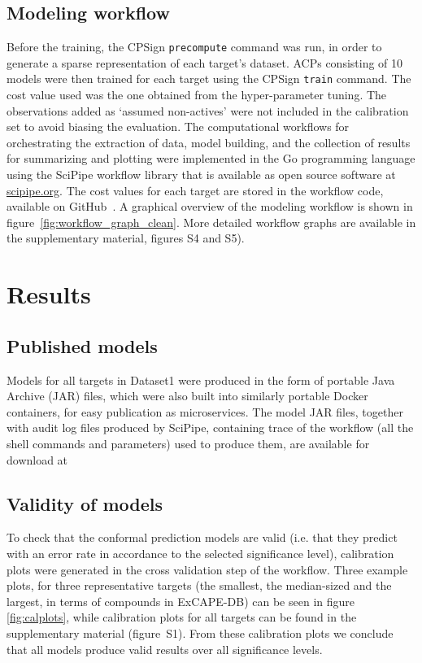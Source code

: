 \documentclass[utf8]{frontiersSCNS} %
\begin{document}
\subsection{Modeling workflow}
Before the training, the CPSign \texttt{precompute} command was run, in order
to generate a sparse representation of each target's dataset.  ACPs consisting
of 10 models were then trained for each target using the CPSign \texttt{train}
command. The cost value used was the one obtained from the hyper-parameter
tuning. The observations added as `assumed non-actives' were not included in
the calibration set to avoid biasing the evaluation.
The computational workflows for orchestrating the extraction of data, model
building, and the collection of results for summarizing and plotting were
implemented in the Go programming language using the SciPipe workflow library
that is available as open source software at
\href{http://scipipe.org}{scipipe.org}.  The cost values for each target are
stored in the workflow code, available on GitHub~\cite{PTPGitHub}.
A graphical overview of the modeling workflow is shown in
figure~\ref{fig:workflow_graph_clean}. More detailed workflow graphs are
available in the supplementary material, figures S4 and S5).


\section{Results} \label{Results}

\subsection{Published models}
Models for all targets in Dataset1 were produced in the form of portable Java
Archive (JAR) files, which were also built into similarly portable Docker
containers, for easy publication as microservices.  The model JAR files,
together with audit log files produced by SciPipe, containing trace of the
workflow (all the shell commands and parameters) used to produce them, are
available for download at~\cite{ModelsZenodo}

\subsection{Validity of models}

To check that the conformal prediction models are valid (i.e. that they predict with
an error rate in accordance to the selected significance level), calibration plots
were generated in the cross validation step of the workflow. Three example
plots, for three representative targets (the smallest, the median-sized and the
largest, in terms of compounds in ExCAPE-DB) can be seen in figure
\ref{fig:calplots}, while calibration plots for all targets can be
found in the supplementary material (figure~S1).
From these calibration plots we conclude that all models produce valid results over all
significance levels.
\end{document}
